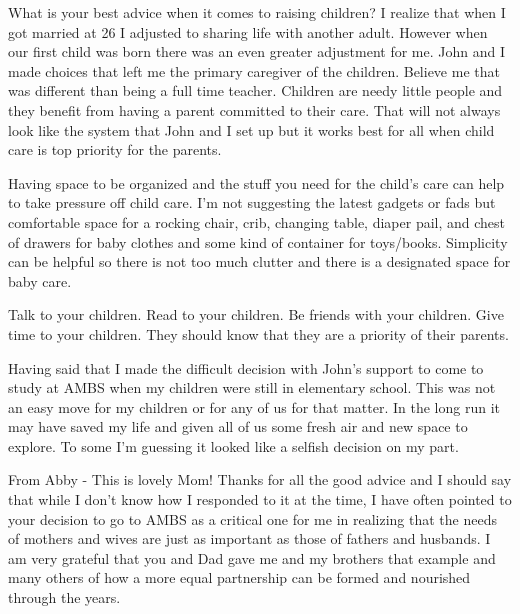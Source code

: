 What is your best advice when it comes to raising children?
I realize that when I got married at 26 I adjusted to sharing life with another adult.
However when our first child was born there was an even greater adjustment for me.
John and I made choices that left me the primary caregiver of the children.
Believe me that was different than being a full time teacher.
Children are needy little people and they benefit from having a parent committed to their care.
That will not always look like the system that John and I set up but it works best for all when child care is top priority for the parents.

Having space to be organized and the stuff you need for the child's care can help to take pressure off child care.
I'm not suggesting the latest gadgets or fads but comfortable space for a rocking chair, crib, changing table, diaper pail, and chest of drawers for baby clothes and some kind of container for toys/books.
Simplicity can be helpful so there is not too much clutter and there is a designated space for baby care.

Talk to your children.
Read to your children.
Be friends with your children.
Give time to your children.
They should know that they are a priority of their parents.

Having said that I made the difficult decision with John's support to come to study at AMBS when my children were still in elementary school.
This was not an easy move for my children or for any of us for that matter.
In the long run it may have saved my life and given all of us some fresh air and new space to explore.
To some I'm guessing it looked like a selfish decision on my part.

From Abby - This is lovely Mom! Thanks for all the good advice and I should say that while I don't know how I responded to it at the time, I have often pointed to your decision to go to AMBS as a critical one for me in realizing that the needs of mothers and wives are just as important as those of fathers and husbands.
I am very grateful that you and Dad gave me and my brothers that example and many others of how a more equal partnership can be formed and nourished through the years.





